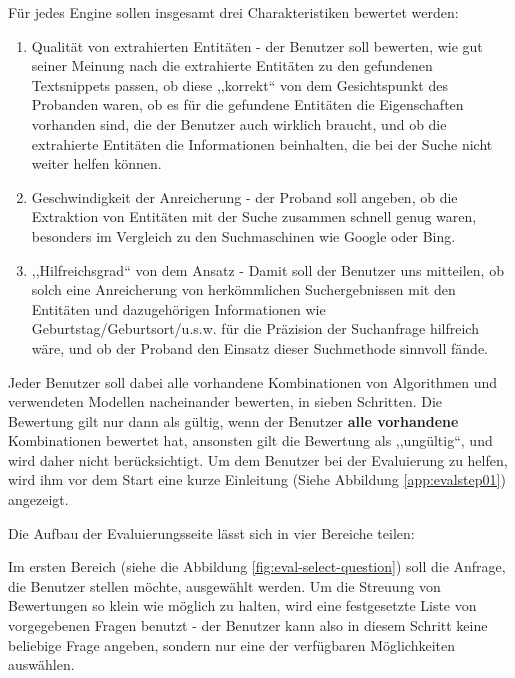 Für jedes Engine sollen insgesamt drei Charakteristiken bewertet werden:
\begin{enumerate}
\item Qualität von extrahierten Entitäten - der Benutzer soll bewerten, wie gut seiner Meinung nach die extrahierte Entitäten zu den gefundenen Textsnippets passen, ob diese ,,korrekt`` von dem Gesichtspunkt des Probanden waren, ob es für die gefundene Entitäten die Eigenschaften vorhanden sind, die der Benutzer auch wirklich braucht, und ob die extrahierte Entitäten die Informationen beinhalten, die bei der Suche nicht weiter helfen können.
\item Geschwindigkeit der Anreicherung - der Proband soll angeben, ob die Extraktion von Entitäten mit der Suche zusammen schnell genug waren, besonders im Vergleich zu den Suchmaschinen wie Google oder Bing.
\item ,,Hilfreichsgrad`` von dem Ansatz - Damit soll der Benutzer uns mitteilen, ob solch eine Anreicherung von herkömmlichen Suchergebnissen mit den Entitäten und dazugehörigen Informationen wie Geburtstag/Geburtsort/u.s.w. für die Präzision der Suchanfrage hilfreich wäre, und ob der Proband den Einsatz dieser Suchmethode sinnvoll fände.  
\end{enumerate}
Jeder Benutzer soll dabei alle vorhandene Kombinationen von Algorithmen und verwendeten Modellen nacheinander bewerten, in sieben Schritten. Die Bewertung gilt nur dann als gültig, wenn der Benutzer \textbf{alle vorhandene} Kombinationen bewertet hat, ansonsten gilt die Bewertung als ,,ungültig``, und wird daher nicht berücksichtigt. Um dem Benutzer bei der Evaluierung zu helfen, wird ihm vor dem Start eine kurze Einleitung (Siehe Abbildung \ref{app:evalstep01}) angezeigt.

Die Aufbau der Evaluierungsseite lässt sich in vier Bereiche teilen:

Im ersten Bereich (siehe die Abbildung \ref{fig:eval-select-question}) soll die Anfrage, die Benutzer stellen möchte, ausgewählt werden. Um die Streuung von Bewertungen so klein wie möglich zu halten, wird eine festgesetzte Liste von vorgegebenen Fragen benutzt - der Benutzer kann also in diesem Schritt keine beliebige Frage angeben, sondern nur eine der verfügbaren Möglichkeiten auswählen.


